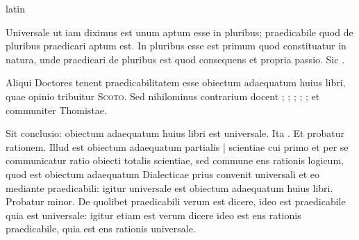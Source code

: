\begin{otherlanguage*}{latin}
        \pstart
        \pend
      
\pstart
  Universale ut iam diximus est unum aptum esse in pluribus; praedicabile quod de pluribus praedicari aptum est. In pluribus esse est primum quod constituatur in natura, unde praedicari de pluribus est quod consequens et propria passio. Sic . 
\pend

\pstart
  Aliqui Doctores tenent praedicabilitatem esse obiectum adaequatum huius libri, quae opinio tribuitur \textsc{Scoto}. Sed nihilominus contrarium docent  ; ; ; ; ;  et communiter Thomistae. 
\pend

\pstart
  Sit conclusio: obiectum adaequatum huius libri est universale. Ita . Et probatur rationem. Illud est obiectum adaequatum partialis \textnormal{|}   scientiae cui primo et per se communicatur ratio obiecti totalis scientiae, sed commune ens rationis logicum, quod est obiectum adaequatum Dialecticae prius convenit universali et eo mediante praedicabili: igitur universale est obiectum adaequatum huius libri. Probatur minor. De quolibet praedicabili verum est dicere, ideo est praedicabile quia est universale: igitur etiam est verum dicere ideo est ens rationis praedicabile, quia est ens rationis universale. 
\pend


\end{otherlanguage*}
